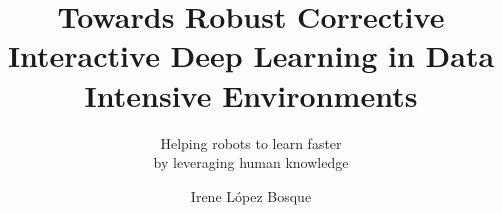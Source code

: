 \documentclass{layout/tudelft-report}
\begin{document}
\frontmatter

\title{Towards Robust Corrective Interactive Deep Learning in Data Intensive Environments}
\subtitle{Helping robots to learn faster \\ by leveraging human knowledge} %
\author{Irene López Bosque}
\subject{Master Thesis}


\makecover






%

\tableofcontents

%

\mainmatter














\setcounter{biburlnumpenalty}{7000}
\setcounter{biburllcpenalty}{7000}
\setcounter{biburlucpenalty}{7000}

\printbibliography[title=References]

\appendix




\end{document}
